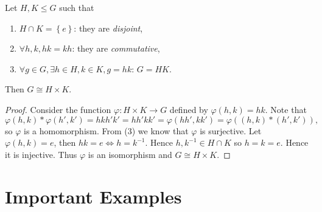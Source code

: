 \documentclass[10pt]{article}
\def\le{\leqslant}
\begin{document}
    \begin{theorem}\label{thm:Direct Product Theorem}
        Let $ H,K\le G $ such that
        \begin{enumerate}[(1)]
            \item $ H \cap K=\left\{ e\right\} $: they are \textit{disjoint},
            \item $ \forall h,k, hk=kh $: they are \textit{commutative},
            \item $ \forall g\in G, \exists h\in H, k\in K, g=hk $: $ G=HK $.
        \end{enumerate}
        Then $ G \cong H \times K $.
    \end{theorem}
    \begin{proof}
        Consider the function $ \varphi: H\times K \to G $ defined by $ \varphi(h,k)=hk $. Note that 
        \[
            \varphi(h,k) * \varphi(h',k') = hkh'k'=hh'kk'=\varphi(hh',kk')=\varphi((h,k)*(h',k'))
        ,\]
        so $ \varphi $ is a homomorphism. From (3) we know that $ \varphi $ is surjective. Let $ \varphi(h,k)=e $, then $ hk=e \Leftrightarrow h=k^{-1} $. Hence $ h,k^{-1}\in H \cap K $ so $ h=k=e $. Hence it is injective. Thus $\varphi$ is an isomorphism and $ G \cong H \times K $.
    \end{proof}
    \section{Important Examples}
\end{document}
